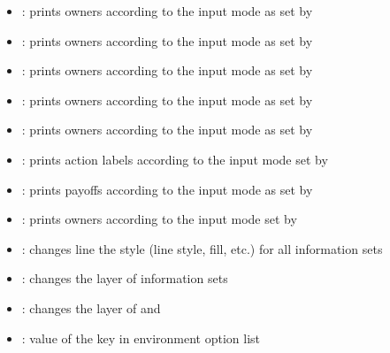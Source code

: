 \begin{itemize}
\item \cmd{\xtInfoset*}: prints owners according to the input mode as set by \cmd{\setistmathTF(*)}
\item \cmd{\xtInfosetO*}: prints owners according to the input mode as set by \cmd{\setistmathTF(*)}
\item \cmd{\xtCInfoset*}: prints owners according to the input mode as set by \cmd{\setistmathTF(*)}
\item \cmd{\xtCInfosetO*}: prints owners according to the input mode as set by \cmd{\setistmathTF(*)} 
\item \cmd{\xtOwner*}: prints owners according to the input mode as set by \cmd{\setistmathTF(*)}
\item \cmd{\xtActionLabel*}: prints action labels according to the input mode set by \cmd{\setistmathTF(*)}
\item \cmd{\xtPayoff*}: prints payoffs according to the input mode as set by \cmd{\setistmathTF(*)}
\item \cmd{\xtInfosetOwner*}: prints owners according to the input mode set by \cmd{\setistmathTF(*)}
%
\listdivider

\item \cmd{\setxtinfosetstyle}: changes line the style (line style, fill, etc.) for all information sets
\item \cmd{\setxtinfosetlayer}: changes the layer of information sets
\item \cmd{\setxtsubgamelayer}: changes the layer of \cmd{\xtSubgameBox} and \cmd{\xtSubgameOval}
\item \cmd{\setistgameshorten}: value of the key  in  environment option list
%
\listdivider


\end{itemize}
